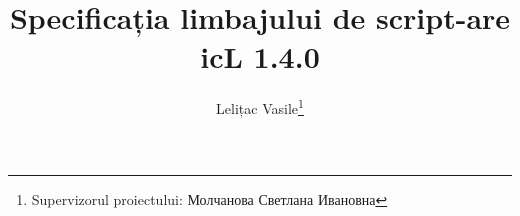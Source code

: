 \documentclass[a4paper, 12pt]{extarticle}
\begin{document}



\title{Specificația limbajului de script-are icL 1.4.0}
\author{Lelițac Vasile\thanks{Supervizorul proiectului: Молчанова Светлана Ивановна}}




\renewcommand{\contentsname}{\textsf{Cuprins}}\makeatletter
\renewcommand{\l@section}{\@dottedtocline{1}{1.5em}{2.6em}}
\renewcommand{\l@subsection}{\@dottedtocline{2}{4.0em}{3.6em}}
\renewcommand{\l@subsubsection}{\@dottedtocline{3}{7.4em}{4.5em}}
\makeatother
\tableofcontents

\end{document}

